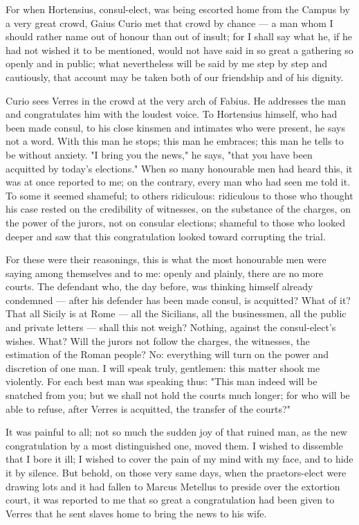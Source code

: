  For when Hortensius, consul-elect, was being escorted home from the Campus by a very great crowd, Gaius Curio met that crowd by chance --- a man whom I should rather name out of honour than out of insult; for I shall say what he, if he had not wished it to be mentioned, would not have said in so great a gathering so openly and in public; what nevertheless will be said by me step by step and cautiously, that account may be taken both of our friendship and of his dignity.

 Curio sees Verres in the crowd at the very arch of Fabius. He addresses the man and congratulates him with the loudest voice. To Hortensius himself, who had been made consul, to his close kinsmen and intimates who were present, he says not a word. With this man he stops; this man he embraces; this man he tells to be without anxiety. "I bring you the news," he says, "that you have been acquitted by today's elections." When so many honourable men had heard this, it was at once reported to me; on the contrary, every man who had seen me told it. To some it seemed shameful; to others ridiculous: ridiculous to those who thought his case rested on the credibility of witnesses, on the substance of the charges, on the power of the jurors, not on consular elections; shameful to those who looked deeper and saw that this congratulation looked toward corrupting the trial.

 For these were their reasonings, this is what the most honourable men were saying among themselves and to me: openly and plainly, there are no more courts. The defendant who, the day before, was thinking himself already condemned --- after his defender has been made consul, is acquitted? What of it? That all Sicily is at Rome --- all the Sicilians, all the businessmen, all the public and private letters --- shall this not weigh? Nothing, against the consul-elect's wishes. What? Will the jurors not follow the charges, the witnesses, the estimation of the Roman people? No: everything will turn on the power and discretion of one man. I will speak truly, gentlemen: this matter shook me violently. For each best man was speaking thus: "This man indeed will be snatched from you; but we shall not hold the courts much longer; for who will be able to refuse, after Verres is acquitted, the transfer of the courts?"

 It was painful to all; not so much the sudden joy of that ruined man, as the new congratulation by a most distinguished one, moved them. I wished to dissemble that I bore it ill; I wished to cover the pain of my mind with my face, and to hide it by silence. But behold, on those very same days, when the praetors-elect were drawing lots and it had fallen to Marcus Metellus to preside over the extortion court, it was reported to me that so great a congratulation had been given to Verres that he sent slaves home to bring the news to his wife.

